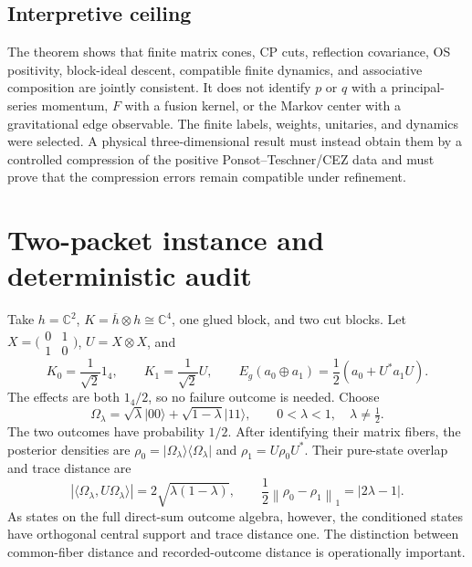 \documentclass[11pt,a4paper]{article}
\theoremstyle{definition}
\theoremstyle{remark}
\newcommand{\C}{\mathbb C}
\newcommand{\ket}[1]{\lvert #1\rangle}
\newcommand{\bra}[1]{\langle #1\rvert}
\newcommand{\norm}[1]{\left\lVert #1\right\rVert}
\begin{document}
\subsection{Interpretive ceiling}

The theorem shows that finite matrix cones, CP cuts, reflection covariance, OS
positivity, block-ideal descent, compatible finite dynamics, and associative
composition are jointly consistent.  It does not identify $p$ or $q$ with a
principal-series momentum, $F$ with a fusion kernel, or the Markov center with a
gravitational edge observable.  The finite labels, weights, unitaries, and dynamics
were selected.  A physical three-dimensional result must instead obtain them by a
controlled compression of the positive Ponsot--Teschner/CEZ data and must prove that the
compression errors remain compatible under refinement.

\section{Two-packet instance and deterministic audit}
\label{sec:two-packet}

Take $h=\C^2$, $K=\overline h\otimes h\cong\C^4$, one glued block, and two cut blocks.
Let $X=\bigl(\begin{smallmatrix}0&1\\1&0\end{smallmatrix}\bigr)$,
$U=X\otimes X$, and
\begin{equation}
 K_0=\frac{1}{\sqrt2}1_4,\qquad
 K_1=\frac{1}{\sqrt2}U,\qquad
 E_g(a_0\oplus a_1)=\frac12(a_0+U^*a_1U).
 \label{eq:two-packet-map}
\end{equation}
The effects are both $1_4/2$, so no failure outcome is needed.  Choose
\begin{equation}
 \Omega_\lambda=\sqrt\lambda\ket{00}+\sqrt{1-\lambda}\ket{11},
 \qquad 0<\lambda<1,\quad\lambda\neq\tfrac12.
 \label{eq:lambda-state}
\end{equation}
The two outcomes have probability $1/2$.  After identifying their matrix fibers, the
posterior densities are $\rho_0=\ket{\Omega_\lambda}\bra{\Omega_\lambda}$ and
$\rho_1=U\rho_0U^*$.  Their pure-state overlap and trace distance are
\begin{equation}
 |\langle\Omega_\lambda,U\Omega_\lambda\rangle|
 =2\sqrt{\lambda(1-\lambda)},\qquad
 \frac12\norm{\rho_0-\rho_1}_1=|2\lambda-1|.
 \label{eq:posterior-distance}
\end{equation}
As states on the full direct-sum outcome algebra, however, the conditioned states have
orthogonal central support and trace distance one.  The distinction between
common-fiber distance and recorded-outcome distance is operationally important.
\end{document}

